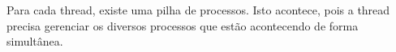 \begin{question}

    Para cada thread, existe uma pilha de processos. Isto acontece,
    pois a thread precisa gerenciar os diversos processos que estão 
    acontecendo de forma simultânea.

\end{question}

